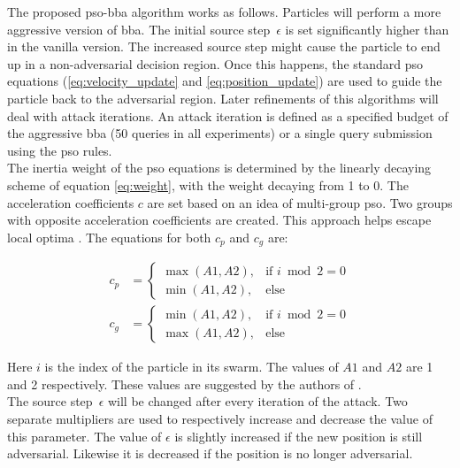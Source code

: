 The proposed \gls{pso}-\gls{bba} algorithm works as follows. Particles will perform a more aggressive version of \gls{bba}. The initial source step~$\epsilon$ is set significantly higher than in the vanilla version. The increased source step might cause the particle to end up in a non-adversarial decision region. Once this happens, the standard \gls{pso} equations (\ref{eq:velocity_update} and \ref{eq:position_update}) are used to guide the particle back to the adversarial region. Later refinements of this algorithms will deal with attack iterations. An attack iteration is defined as a specified budget of the aggressive \gls{bba} (50 queries in all experiments) or a single query submission using the \gls{pso} rules.\\

The inertia weight of the \gls{pso} equations is determined by the linearly decaying scheme of equation \ref{eq:weight}, with the weight decaying from 1 to 0. The acceleration coefficients $c$ are set based on an idea of multi-group \gls{pso}. Two groups with opposite acceleration coefficients are created. This approach helps escape local optima \cite{opposite_cs}. The equations for both $c_p$ and $c_g$ are:

\begin{align}
c_p &= 
\begin{cases}
	\max(A1, A2), &\text{if } i\bmod 2 = 0\\
	\min(A1, A2), &\text{else}
\end{cases} \label{eq:cp_mg}\\
c_g &=
\begin{cases}
	\min(A1, A2), &\text{if } i\bmod 2 = 0\\
	\max(A1, A2), &\text{else}
\end{cases} \label{eq:cg_mg}
\end{align} 

Here $i$ is the index of the particle in its swarm. The values of $A1$ and $A2$ are 1 and 2 respectively. These values are suggested by the authors of \cite{suryanto2020}.\\

The source step~$\epsilon$ will be changed after every iteration of the attack. Two separate multipliers are used to respectively increase and decrease the value of this parameter. The value of $\epsilon$ is slightly increased if the new position is still adversarial. Likewise it is decreased if the position is no longer adversarial.\\

